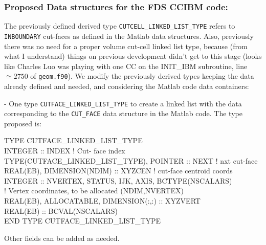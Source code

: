 \documentclass[12pt]{article}
\newenvironment{myfont}{\fontfamily{\ttdefault}\selectfont}{\par}
\begin{document}
\subsubsection*{Proposed Data structures for the FDS CCIBM code:}

The previously defined derived type \texttt{CUTCELL\_LINKED\_LIST\_TYPE} refers to \texttt{INBOUNDARY} cut-faces as defined in the Matlab data structures. Also, previously there was no need for a proper volume cut-cell linked list type, because (from what I understand) things on previous development didn't get to this stage (looks like Charles Luo was playing with one CC on the INIT\_IBM subroutine, line $\simeq 2750$ of \texttt{geom.f90}).
We modify the previously derived types keeping the data already defined and needed, and considering the Matlab code data containers:
\newline

\noindent  - One type \texttt{CUTFACE\_LINKED\_LIST\_TYPE} to create a linked list with the data corresponding to the \texttt{CUT\_FACE} data structure in the Matlab code. The type proposed is:

\begin{myfont}
\noindent TYPE CUTFACE\_LINKED\_LIST\_TYPE \\
\indent  INTEGER :: INDEX                                                                        ! Cut- face index \\
\indent  TYPE(CUTFACE\_LINKED\_LIST\_TYPE), POINTER :: NEXT    ! nxt cut-face \\
\indent   REAL(EB), DIMENSION(NDIM) :: XYZCEN                                 ! cut-face centroid coords \\
\indent   INTEGER :: NVERTEX, STATUS, IJK, AXIS, BCTYPE(NSCALARS)            \\
\indent   ! Vertex coordinates, to be allocated (NDIM,NVERTEX) \\
\indent   REAL(EB), ALLOCATABLE, DIMENSION(:,:) :: XYZVERT \\
\indent   REAL(EB) :: BCVAL(NSCALARS) \\
\noindent END TYPE CUTFACE\_LINKED\_LIST\_TYPE \\
\end{myfont}
Other fields can be added as needed.
\end{document}
